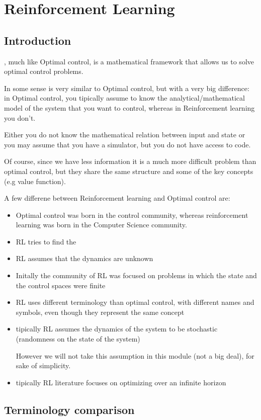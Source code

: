 \chapter{Reinforcement Learning}
\section{Introduction}
, much like Optimal control, is a mathematical framework that allows us to solve optimal control problems.

In some sense is very similar to Optimal control, but with a very big difference: in Optimal control, you tipically assume to know the analytical/mathematical model of the system that you want to control, whereas in Reinforcement learning you don't.

Either you do not know the mathematical relation between input and state or you may assume that you have a simulator, but you do not have access to code.

Of course, since we have less information it is a much more difficult problem than optimal control, but they share the same structure and some of the key concepts (e.g value function).

A few differene between Reinforcement learning and Optimal control are:
\begin{itemize}
\item Optimal control was born in the control community, whereas reinforcement learning was born in the Computer Science community.
\item RL tries to find the 
\item RL assumes that the dynamics are unknown
\item Initally the community of RL was focused on problems in which the state and the control spaces were finite
\item RL uses different terminology than optimal control, with different names and symbols, even though they represent the same concept
\item tipically RL assumes the dynamics of the system to be stochastic (randomness on the state of the system)

However we will not take this assumption in this module (not a big deal), for sake of simplicity.
\item tipically RL literature focuses on optimizing over an infinite horizon
\end{itemize}

\section{Terminology comparison}

